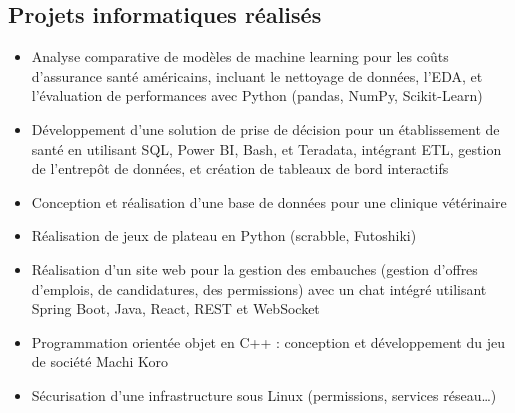 \documentclass[9pt, oneside, a4paper, titlepage]{extarticle}
\begin{document}
\begin{tcolorbox}
\begin{minipage}[t]{12.8cm}
\begin{tcolorbox}[grow to right by = 0.6cm, colback = gray!25, colframe = white]
                \section*{Projets informatiques réalisés}

                \begin{itemize}
                    \item Analyse comparative de modèles de machine learning pour les coûts d'assurance santé américains, incluant le nettoyage de données, l'EDA, et l'évaluation de performances avec Python (pandas, NumPy, Scikit-Learn)
                    \item Développement d'une solution de prise de décision pour un établissement de santé en utilisant SQL, Power BI, Bash, et Teradata, intégrant ETL, gestion de l'entrepôt de données, et création de tableaux de bord interactifs
                    \item Conception et réalisation d'une base de données pour une clinique vétérinaire
                    \item Réalisation de jeux de plateau en Python (scrabble, Futoshiki)
                    \item Réalisation d'un site web pour la gestion des embauches (gestion d'offres d'emplois, de candidatures, des permissions) avec un chat intégré utilisant Spring Boot, Java, React, REST et WebSocket
                    \item Programmation orientée objet en C++ : conception et développement du jeu de société Machi Koro
                    \item Sécurisation d'une infrastructure sous Linux (permissions, services réseau\ldots)
                \end{itemize}

\end{tcolorbox}
\end{minipage}
\end{tcolorbox}
\end{document}
